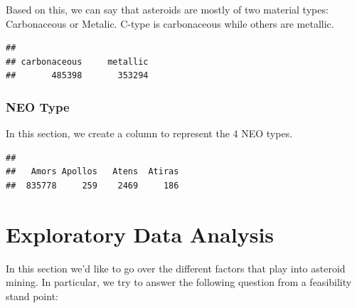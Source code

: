 \documentclass[
]{article}
\newenvironment{Shaded}{\begin{snugshade}}{\end{snugshade}}
\newcommand{\AttributeTok}[1]{\textcolor[rgb]{0.13,0.29,0.53}{#1}}
\newcommand{\ControlFlowTok}[1]{\textcolor[rgb]{0.13,0.29,0.53}{\textbf{#1}}}
\newcommand{\FloatTok}[1]{\textcolor[rgb]{0.00,0.00,0.81}{#1}}
\newcommand{\FunctionTok}[1]{\textcolor[rgb]{0.13,0.29,0.53}{\textbf{#1}}}
\newcommand{\NormalTok}[1]{#1}
\newcommand{\OtherTok}[1]{\textcolor[rgb]{0.56,0.35,0.01}{#1}}
\newcommand{\SpecialCharTok}[1]{\textcolor[rgb]{0.81,0.36,0.00}{\textbf{#1}}}
\newcommand{\StringTok}[1]{\textcolor[rgb]{0.31,0.60,0.02}{#1}}
\begin{document}
Based on this, we can say that asteroids are mostly of two material
types: Carbonaceous or Metalic. C-type is carbonaceous while others are
metallic.

\begin{verbatim}
## 
## carbonaceous     metallic 
##       485398       353294
\end{verbatim}

\hypertarget{neo-type}{%
\subsubsection{NEO Type}\label{neo-type}}

In this section, we create a column to represent the 4 NEO types.

\begin{Shaded}
\end{Shaded}

\begin{verbatim}
## 
##   Amors Apollos   Atens  Atiras 
##  835778     259    2469     186
\end{verbatim}

\hypertarget{exploratory-data-analysis}{%
\section{Exploratory Data Analysis}\label{exploratory-data-analysis}}

In this section we'd like to go over the different factors that play
into asteroid mining. In particular, we try to answer the following
question from a feasibility stand point:
\end{document}
